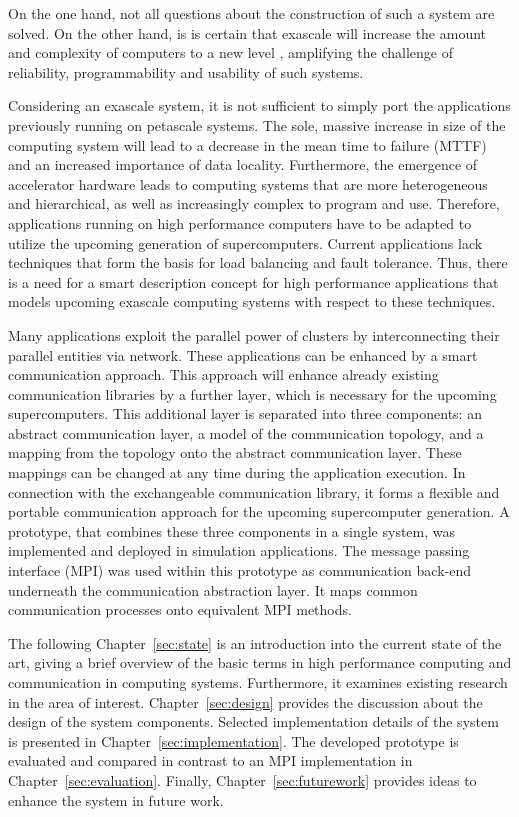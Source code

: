 On the one hand, not all questions about the construction of such a system are
solved. On the other hand, is is certain that exascale will increase the amount and
complexity of computers to a new level \cite{ref:cresta}, amplifying
the challenge of reliability, programmability and usability of such
systems.

Considering an exascale system, it is not sufficient to simply port
the applications previously running on petascale systems. The sole,
massive increase in size of the computing system will lead to a
decrease in the mean time to failure (MTTF) and an increased
importance of data locality.  Furthermore, the emergence of
accelerator hardware leads to computing systems that are more
heterogeneous and hierarchical, as well as increasingly complex to
program and use. Therefore, applications running on high performance
computers have to be adapted to utilize the upcoming generation of
supercomputers.  Current applications lack techniques that form the
basis for load balancing and fault tolerance.  Thus, there is a need
for a smart description concept for high performance applications that
models upcoming exascale computing systems with respect to these
techniques.

Many applications exploit the parallel power of clusters by
interconnecting their parallel entities via network. These
applications can be enhanced by a smart communication approach. This
approach will enhance already existing communication libraries by a
further layer, which is necessary for the upcoming
supercomputers. This additional layer is separated into three
components: an abstract communication layer, a model of the
communication topology, and a mapping from the topology onto the
abstract communication layer.  These mappings can be changed at any
time during the application execution. In connection with the
exchangeable communication library, it forms a flexible and portable
communication approach for the upcoming supercomputer generation.  A
prototype, that combines these three components in a single system,
was implemented and deployed in simulation applications. The message
passing interface (MPI) was used within this prototype as
communication back-end underneath the communication abstraction
layer. It maps common communication processes onto equivalent MPI
methods.

The following Chapter~\ref{sec:state} is an introduction into the
current state of the art, giving a brief overview of the basic terms
in high performance computing and communication in computing
systems. Furthermore, it examines existing research in the area of
interest. Chapter~\ref{sec:design} provides the discussion about the
design of the system components.  Selected implementation details of
the system is presented in Chapter~\ref{sec:implementation}. The
developed prototype is evaluated and compared in contrast to an MPI
implementation in Chapter~\ref{sec:evaluation}. Finally,
Chapter~\ref{sec:futurework} provides ideas to enhance the system in
future work.


\cleardoublepage

